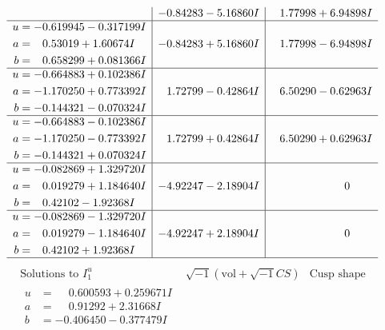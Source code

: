 \documentclass[1p]{elsarticle_modified}
\theoremstyle{definition}
\newcommand{\I}{\sqrt{-1}}
\begin{document}
$$\begin{array}{c|c|c}
 & -0.84283 - 5.16860 I & \phantom{-}1.77998 + 6.94898 I \\ \hline\begin{aligned}
u &= -0.619945 - 0.317199 I \\
a &= \phantom{-}0.53019 + 1.60674 I \\
b &= \phantom{-}0.658299 + 0.081366 I\end{aligned}
 & -0.84283 + 5.16860 I & \phantom{-}1.77998 - 6.94898 I \\ \hline\begin{aligned}
u &= -0.664883 + 0.102386 I \\
a &= -1.170250 + 0.773392 I \\
b &= -0.144321 - 0.070324 I\end{aligned}
 & \phantom{-}1.72799 - 0.42864 I & \phantom{-}6.50290 - 0.62963 I \\ \hline\begin{aligned}
u &= -0.664883 - 0.102386 I \\
a &= -1.170250 - 0.773392 I \\
b &= -0.144321 + 0.070324 I\end{aligned}
 & \phantom{-}1.72799 + 0.42864 I & \phantom{-}6.50290 + 0.62963 I \\ \hline\begin{aligned}
u &= -0.082869 + 1.329720 I \\
a &= \phantom{-}0.019279 + 1.184640 I \\
b &= \phantom{-}0.42102 - 1.92368 I\end{aligned}
 & -4.92247 - 2.18904 I & \phantom{-0.000000 } 0 \\ \hline\begin{aligned}
u &= -0.082869 - 1.329720 I \\
a &= \phantom{-}0.019279 - 1.184640 I \\
b &= \phantom{-}0.42102 + 1.92368 I\end{aligned}
 & -4.92247 + 2.18904 I & \phantom{-0.000000 } 0\\
 \hline 
 \end{array}$$\newpage$$\begin{array}{c|c|c}  
\text{Solutions to }I^u_{1}& \I (\text{vol} + \sqrt{-1}CS) & \text{Cusp shape}\\
 \hline 
\begin{aligned}
u &= \phantom{-}0.600593 + 0.259671 I \\
a &= \phantom{-}0.91292 + 2.31668 I \\
b &= -0.406450 - 0.377479 I\end{aligned}

\end{array}$$
\end{document}
